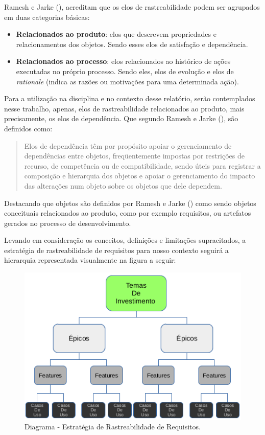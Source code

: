   Ramesh e Jarke (\citeyear{ramesh01}), acreditam que os elos de rastreabilidade podem ser agrupados em duas categorias básicas:
  \begin{itemize}
   \item \textbf{Relacionados ao produto}: elos que descrevem propriedades e relacionamentos dos objetos. Sendo esses elos de satisfação e dependência.
   \item \textbf{Relacionados ao processo}: elos relacionados ao histórico de ações executadas no próprio processo. Sendo eles, elos de evolução  e elos de \textit{rationale} (indica as razões ou motivações para uma determinada ação).
  \end{itemize}

  Para a utilização na disciplina e no contexto desse relatório, 
  serão contemplados nesse trabalho, apenas, elos de rastreabilidade relacionados ao produto, 
  mais precisamente, os elos de dependência. Que segundo Ramesh e Jarke (\citeyear{ramesh01}), são definidos como:

  \begin{quote}
  Elos de dependência têm por propósito apoiar o gerenciamento de dependências entre objetos, 
  freqüentemente impostas por restrições de recurso, de competência ou de compatibilidade, 
  sendo úteis para registrar a composição e hierarquia dos objetos e apoiar o gerenciamento do impacto das 
  alterações num objeto sobre os objetos que dele dependem. \cite{ramesh01}
  \end{quote}
  
  Destacando que objetos são definidos por Ramesh e Jarke (\citeyear{ramesh01}) como sendo objetos conceituais 
  relacionados ao produto, como por exemplo requisitos, ou artefatos gerados no processo de desenvolvimento.

  Levando em consideração os  conceitos, definições e limitações supracitados, a estratégia de rastreabilidade de 
  requisitos para nosso contexto seguirá a hierarquia representada visualmente na figura a seguir:
  
  \begin{figure}[!htbp]
    \centering
    \includegraphics[scale=0.7]{editaveis/figuras/traceability}
    \caption[Diagrama - Estratégia de Rastreabilidade de Requisitos.] {Diagrama - Estratégia de Rastreabilidade de Requisitos. \footnotemark}
    \label{traceability}
  \end{figure}
 
